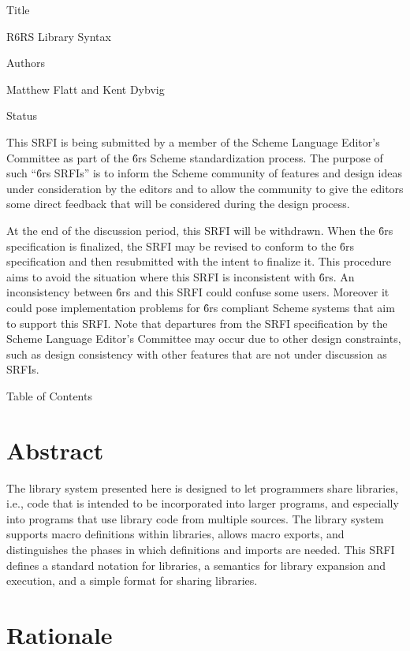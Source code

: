 \documentclass{monograph}
\def\r#1rs{R#1RS}
\renewcommand{\sectionstar}[1]{\raw{\raw{<h1>}}#1\raw{\raw{</h1>}}}
\begin{document}
\iflatex
\schemeindent=0pt
\parskip=4pt
\parindent=0pt
\fi

\sectionstar{Title}

R6RS Library Syntax

\sectionstar{Authors}

Matthew Flatt and Kent Dybvig

\sectionstar{Status}

This SRFI is being submitted by a member of the Scheme Language Editor's
Committee as part of the {\r6rs} Scheme standardization process.  The purpose
of such ``{\r6rs} SRFIs'' is to inform the Scheme community of features and
design ideas under consideration by the editors and to allow the community
to give the editors some direct feedback that will be considered during
the design process.

At the end of the discussion period, this SRFI will be withdrawn.  When
the {\r6rs} specification is finalized, the SRFI may be revised to conform to
the {\r6rs} specification and then resubmitted with the intent to finalize
it.  This procedure aims to avoid the situation where this SRFI is
inconsistent with {\r6rs}.  An inconsistency between {\r6rs} and this SRFI could
confuse some users.  Moreover it could pose implementation problems for
{\r6rs} compliant Scheme systems that aim to support this SRFI.  Note that
departures from the SRFI specification by the Scheme Language Editor's
Committee may occur due to other design constraints, such as design
consistency with other features that are not under discussion as SRFIs.

\ifhtml
\sectionstar{Table of Contents}
\tableofcontents
\fi

\section{Abstract}

The library system presented here is designed to let programmers share
libraries, i.e., code that is intended to be incorporated into larger
programs, and especially into programs that use library code from multiple
sources.  The library system supports macro definitions within libraries,
allows macro exports, and distinguishes the phases in which definitions
and imports are needed.  This SRFI defines a standard notation for
libraries, a semantics for library expansion and execution, and a simple
format for sharing libraries.

\section{Rationale\label{sec:rationale}}
\end{document}
